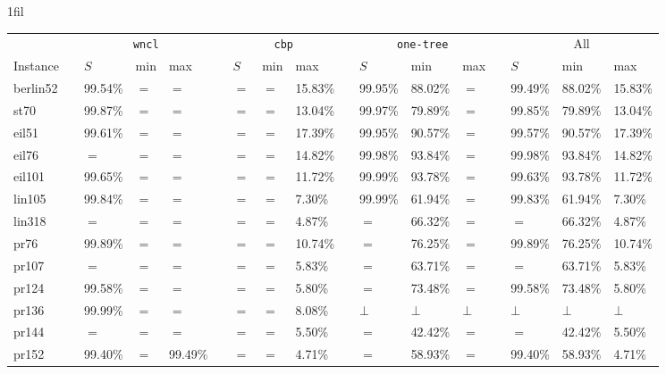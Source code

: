\documentclass[runningheads]{llncs}
\makeatletter
\newcommand*{\centerfloat}{%
  \parindent \z@
  \leftskip \z@ \@plus 1fil \@minus \textwidth
  \rightskip\leftskip
  \parfillskip \z@skip}
\newcommand{\cons}[1]{\texttt{#1}}
\makeatother
\begin{document}
\newlength{\cw}
\setlength{\cw}{1.2cm}

\begin{sidewaystable}
  \centerfloat
  \begin{tabular}{l p{0.2cm}p{\cw}p{\cw}p{\cw} cp{\cw}p{\cw}p{\cw} cp{\cw}p{\cw}p{\cw} cp{\cw}p{\cw}p{\cw}}
    \toprule 
               & & 
\multicolumn{3}{c}{\cons{wncl}} & & \multicolumn{3}{c}{\cons{cbp}} & & \multicolumn{3}{c}{\cons{one-tree}} & & \multicolumn{3}{c}{All} 
\\
\cmidrule(lr){3-5}
\cmidrule(lr){7-9}
\cmidrule(lr){11-13}
\cmidrule(lr){15-17}
    Instance
    & & $S$ & min & max  
    & & $S$ & min & max  
    & & $S$ & min & max  
    & & $S$ & min & max 
    \\
    \midrule
berlin52 &  & 99.54\% & $=$ & $=$     &  & $=$ & $=$ & 15.83\% &  & 99.95\% & 88.02\% & $=$    &  & 99.49\% & 88.02\% & 15.83\% \\ 
st70     &  & 99.87\% & $=$ & $=$     &  & $=$ & $=$ & 13.04\% &  & 99.97\% & 79.89\% & $=$    &  & 99.85\% & 79.89\% & 13.04\% \\
eil51    &  & 99.61\% & $=$ & $=$     &  & $=$ & $=$ & 17.39\% &  & 99.95\% & 90.57\% & $=$    &  & 99.57\% & 90.57\% & 17.39\% \\ 
eil76    &  & $=$     & $=$ & $=$     &  & $=$ & $=$ & 14.82\% &  & 99.98\% & 93.84\% & $=$    &  & 99.98\% & 93.84\% & 14.82\% \\
eil101   &  & 99.65\% & $=$ & $=$     &  & $=$ & $=$ & 11.72\% &  & 99.99\% & 93.78\% & $=$    &  & 99.63\% & 93.78\% & 11.72\% \\
lin105   &  & 99.84\% & $=$ & $=$     &  & $=$ & $=$ & 7.30\%  &  & 99.99\% & 61.94\% & $=$    &  & 99.83\% & 61.94\% & 7.30\%  \\
lin318   &  & $=$     & $=$ & $=$     &  & $=$ & $=$ & 4.87\%  &  & $=$     & 66.32\% & $=$    &  & $=$     & 66.32\% & 4.87\%  \\
pr76     &  & 99.89\% & $=$ & $=$     &  & $=$ & $=$ & 10.74\% &  & $=$     & 76.25\% & $=$    &  & 99.89\% & 76.25\% & 10.74\% \\ 
pr107    &  & $=$     & $=$ & $=$     &  & $=$ & $=$ & 5.83\%  &  & $=$     & 63.71\% & $=$    &  & $=$     & 63.71\% & 5.83\%  \\
pr124    &  & 99.58\% & $=$ & $=$     &  & $=$ & $=$ & 5.80\%  &  & $=$     & 73.48\% & $=$    &  & 99.58\% & 73.48\% & 5.80\%  \\
pr136    &  & 99.99\% & $=$ & $=$     &  & $=$ & $=$ & 8.08\%  &  & $\bot$  & $\bot$  & $\bot$ &  & $\bot$  & $\bot$  & $\bot$  \\
pr144    &  & $=$     & $=$ & $=$     &  & $=$ & $=$ & 5.50\%  &  & $=$     & 42.42\% & $=$    &  & $=$     & 42.42\% & 5.50\%  \\
pr152    &  & 99.40\% & $=$ & 99.49\% &  & $=$ & $=$ & 4.71\%  &  & $=$     & 58.93\% & $=$    &  & 99.40\% & 58.93\% & 4.71\%  \\
    

\end{tabular}
\end{sidewaystable}
\end{document}
